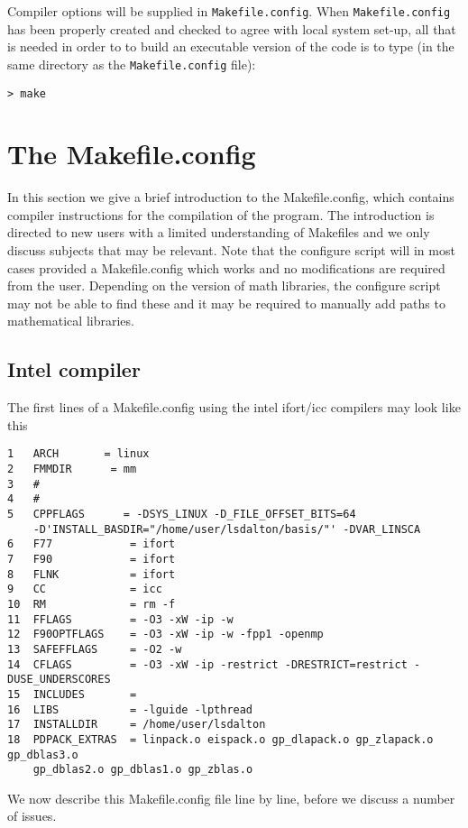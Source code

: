 Compiler options will be supplied in \verb|Makefile.config|.
When  \verb|Makefile.config| has been properly
created and checked
to agree with local system set-up, all that is needed in order to
to build an executable version of the
code is to type
(in the same directory as the \verb|Makefile.config| file):
\begin{verbatim}
> make
\end{verbatim}

\section{The Makefile.config}\label{sec:makefileconfig}

In this section we give a brief introduction to the Makefile.config, which contains compiler instructions for the compilation of the program. 
The introduction is directed to new users with a limited understanding of Makefiles and we only discuss subjects that may be relevant. 
Note that the configure script will in most cases provided a Makefile.config which works and no modifications are required from the user. 
Depending on the version of math libraries, the configure script may not be able to find these and it may be required to manually 
add paths to mathematical libraries. 

\subsection{Intel compiler}\label{ifortMakefile}
The first lines of a Makefile.config using the intel ifort/icc compilers may look like this
\begin{verbatim}
1   ARCH       = linux
2   FMMDIR      = mm
3   #
4   #
5   CPPFLAGS      = -DSYS_LINUX -D_FILE_OFFSET_BITS=64
    -D'INSTALL_BASDIR="/home/user/lsdalton/basis/"' -DVAR_LINSCA
6   F77            = ifort
7   F90            = ifort
8   FLNK           = ifort
9   CC             = icc
10  RM             = rm -f
11  FFLAGS         = -O3 -xW -ip -w
12  F90OPTFLAGS    = -O3 -xW -ip -w -fpp1 -openmp
13  SAFEFFLAGS     = -O2 -w
14  CFLAGS         = -O3 -xW -ip -restrict -DRESTRICT=restrict -DUSE_UNDERSCORES
15  INCLUDES       = 
16  LIBS           = -lguide -lpthread 
17  INSTALLDIR     = /home/user/lsdalton
18  PDPACK_EXTRAS  = linpack.o eispack.o gp_dlapack.o gp_zlapack.o gp_dblas3.o 
    gp_dblas2.o gp_dblas1.o gp_zblas.o
\end{verbatim}
We now describe this Makefile.config file line by line, before we discuss a number of issues.

